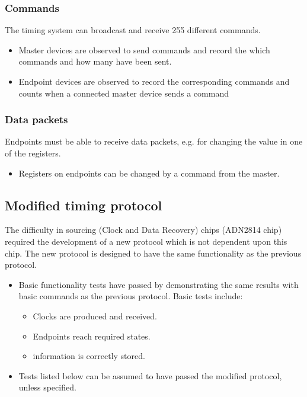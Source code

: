 \documentclass{dune}
\begin{document}
\subsubsection{Commands}
The timing system can broadcast and receive 255 different commands.
\begin{itemize}
  \item Master devices are observed to send commands and record the which commands and how many have been sent.
  \item Endpoint devices are observed to record the corresponding commands and counts when a connected master device sends a command
\end{itemize}

\subsubsection{Data packets}
Endpoints must be able to receive data packets, e.g. for changing the value in one of the registers.
\begin{itemize}
  \item Registers on endpoints can be changed by a command from the master.
\end{itemize}

\subsection{Modified timing protocol}
\label{sec:new-protocol}
The difficulty in sourcing  (Clock and Data Recovery) chips (ADN2814 chip) required the development of a new protocol which is not dependent upon this chip.
The new protocol is designed to have the same functionality as the previous protocol.
\begin{itemize}
  \item Basic functionality tests have passed by demonstrating the same results with basic commands as the previous protocol. Basic tests include:
  \begin{itemize}
  	\item Clocks are produced and received.
  	\item Endpoints reach required states.
  	\item {} information is correctly stored.
  \end{itemize}
  \item Tests listed below can be assumed to have passed the modified protocol, unless specified.
\end{itemize}
\end{document}
